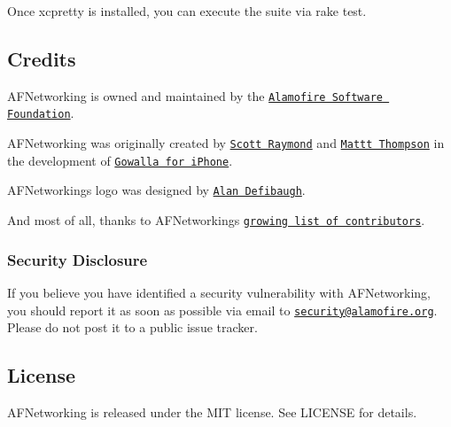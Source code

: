 Once {\ttfamily xcpretty} is installed, you can execute the suite via {\ttfamily rake test}.

\subsection*{Credits}

A\+F\+Networking is owned and maintained by the \href{http://alamofire.org}{\tt Alamofire Software Foundation}.

A\+F\+Networking was originally created by \href{https://github.com/sco/}{\tt Scott Raymond} and \href{https://github.com/mattt/}{\tt Mattt Thompson} in the development of \href{https://en.wikipedia.org/wiki/Gowalla}{\tt Gowalla for i\+Phone}.

A\+F\+Networking\textquotesingle{}s logo was designed by \href{http://www.alandefibaugh.com/}{\tt Alan Defibaugh}.

And most of all, thanks to A\+F\+Networking\textquotesingle{}s \href{https://github.com/AFNetworking/AFNetworking/graphs/contributors}{\tt growing list of contributors}.

\subsubsection*{Security Disclosure}

If you believe you have identified a security vulnerability with A\+F\+Networking, you should report it as soon as possible via email to \href{mailto:security@alamofire.org}{\tt security@alamofire.\+org}. Please do not post it to a public issue tracker.

\subsection*{License}

A\+F\+Networking is released under the M\+IT license. See L\+I\+C\+E\+N\+SE for details. 
